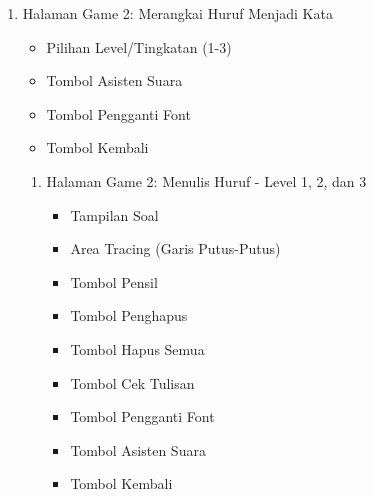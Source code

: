 \documentclass[12pt,a4paper]{report}
\begin{document}
\begin{enumerate}
    \begin{enumerate}[label=\arabic{enumi}\alph*.]
        \item Halaman Game 1: Menulis/Menebalkan Huruf - Level 1, 2, dan 3
        \begin{itemize}
    \item Tampilan Soal
    \item Area Tracing (Garis Putus-Putus)
    \item Tombol Pensil
    \item Tombol Penghapus
    \item Tombol Hapus Semua
    \item Tombol Cek Tulisan
    \item Tombol Pengganti Font
    \item Tombol Asisten Suara
    \item Tombol Kembali
    \end{itemize}
    \end{enumerate}

\item Halaman Game 2: Merangkai Huruf Menjadi Kata
    \begin{itemize}
    \item Pilihan Level/Tingkatan (1-3)
    \item Tombol Asisten Suara
    \item Tombol Pengganti Font
    \item Tombol Kembali
    \end{itemize}

    \begin{enumerate}[label=\arabic{enumi}\alph*.]
        \item Halaman Game 2: Menulis Huruf - Level 1, 2, dan 3
        \begin{itemize}
    \item Tampilan Soal
    \item Area Tracing (Garis Putus-Putus)
    \item Tombol Pensil
    \item Tombol Penghapus
    \item Tombol Hapus Semua
    \item Tombol Cek Tulisan
    \item Tombol Pengganti Font
    \item Tombol Asisten Suara
    \item Tombol Kembali
    \end{itemize}
    \end{enumerate}


\end{enumerate}
\end{document}
